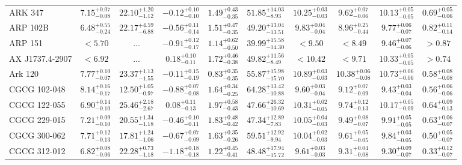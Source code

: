 \documentclass[onecolumn]{mn2e}
\begin{document}
\begin{landscape}
{\begin{center}
\begin{longtable}{lccccccccc}
ARK 347 & $7.15_{-0.08}^{+0.07}$ & $22.10_{-1.12}^{+1.20}$ & $-0.12_{-0.10}^{+0.10}$ & $1.49_{-0.35}^{+0.43}$ &$51.85_{-8.93}^{+14.03}$ & $10.25_{-0.03}^{+0.03}$ & $9.62_{-0.06}^{+0.07}$ & $10.13_{-0.05}^{+0.05}$ & $0.69_{-0.06}^{+0.05}$ \\
ARP 102B & $6.48_{-0.24}^{+0.55}$ & $22.17_{-6.88}^{+4.59}$ & $-0.56_{-0.14}^{+0.11}$ & $1.51_{-0.35}^{+0.47}$ &$49.20_{-13.51}^{+13.04}$ & $9.83_{-0.04}^{+0.04}$ & $8.96_{-0.44}^{+0.25}$ & $9.77_{-0.07}^{+0.06}$ & $0.82_{-0.14}^{+0.11}$ \\
ARP 151 & $<5.70$ & ... & $-0.91_{-0.17}^{+0.12}$ & $1.14_{-0.50}^{+0.62}$ &$39.99_{-14.30}^{+15.58}$ & $<9.50$ & $<8.49$ & $9.46_{-0.06}^{+0.07}$ & $>0.87$ \\
AX J1737.4-2907 & $<6.92$ & ... & $0.18_{-0.11}^{+0.10}$ & $1.72_{-0.38}^{+0.46}$ &$49.82_{-8.49}^{+11.56}$ & $<10.42$ & $<9.71$ & $10.33_{-0.05}^{+0.05}$ & $>0.74$ \\
Ark 120 & $7.77_{-0.07}^{+0.10}$ & $23.37_{-1.55}^{+1.13}$ & $-0.11_{-0.19}^{+0.15}$ & $0.83_{-0.35}^{+0.35}$ &$55.87_{-15.70}^{+15.98}$ & $10.89_{-0.03}^{+0.03}$ & $10.38_{-0.08}^{+0.06}$ & $10.73_{-0.06}^{+0.06}$ & $0.58_{-0.08}^{+0.08}$ \\
CGCG 102-048 & $8.14_{-0.17}^{+0.16}$ & $12.50_{-0.97}^{+1.05}$ & $-0.88_{-0.08}^{+0.07}$ & $1.64_{-0.25}^{+0.34}$ &$64.28_{-10.88}^{+13.42}$ & $9.60_{-0.04}^{+0.03}$ & $9.12_{-0.09}^{+0.07}$ & $9.43_{-0.04}^{+0.03}$ & $0.56_{-0.06}^{+0.06}$ \\
CGCG 122-055 & $6.90_{-0.10}^{+0.14}$ & $25.46_{-2.67}^{+2.18}$ & $0.08_{-0.13}^{+0.11}$ & $1.97_{-0.43}^{+0.58}$ &$47.66_{-10.69}^{+26.32}$ & $10.31_{-0.05}^{+0.02}$ & $9.74_{-0.13}^{+0.12}$ & $10.17_{-0.09}^{+0.05}$ & $0.64_{-0.13}^{+0.09}$ \\
CGCG 229-015 & $7.21_{-0.10}^{+0.09}$ & $20.55_{-1.18}^{+1.34}$ & $-0.46_{-0.11}^{+0.10}$ & $1.83_{-0.42}^{+0.48}$ &$47.34_{-7.83}^{+12.89}$ & $10.05_{-0.03}^{+0.04}$ & $9.49_{-0.07}^{+0.08}$ & $9.91_{-0.05}^{+0.05}$ & $0.63_{-0.07}^{+0.06}$ \\
CGCG 300-062 & $7.71_{-0.13}^{+0.12}$ & $17.81_{-1.06}^{+1.24}$ & $-0.67_{-0.09}^{+0.07}$ & $1.63_{-0.26}^{+0.35}$ &$59.51_{-9.94}^{+12.92}$ & $10.04_{-0.03}^{+0.02}$ & $9.61_{-0.05}^{+0.05}$ & $9.84_{-0.05}^{+0.03}$ & $0.50_{-0.07}^{+0.05}$ \\
CGCG 312-012 & $6.82_{-0.06}^{+0.08}$ & $22.28_{-1.18}^{+0.73}$ & $-1.18_{-0.18}^{+0.18}$ & $1.22_{-0.41}^{+0.45}$ &$48.48_{-15.72}^{+17.94}$ & $9.61_{-0.03}^{+0.03}$ & $9.31_{-0.08}^{+0.04}$ & $9.30_{-0.07}^{+0.09}$ & $0.33_{-0.07}^{+0.12}$ \\

\end{longtable}
\end{center}}
\end{landscape}
\end{document}
